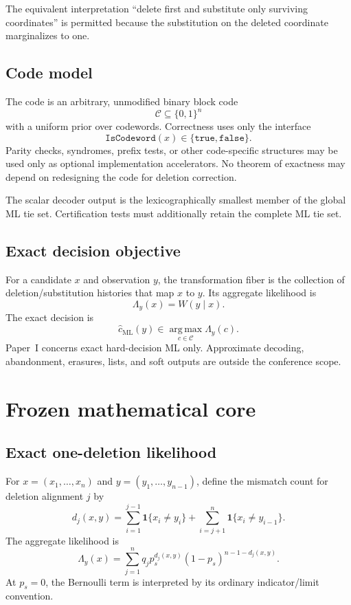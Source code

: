 \documentclass[11pt]{article}
\theoremstyle{definition}
\theoremstyle{remark}
\newcommand{\C}{\mathcal{C}}
\newcommand{\ind}{\mathbf{1}}
\newcommand{\argmax}{\operatorname*{arg\,max}}
\begin{document}
The equivalent interpretation ``delete first and substitute only surviving coordinates'' is permitted because the substitution on the deleted coordinate marginalizes to one.

\subsection{Code model}

The code is an arbitrary, unmodified binary block code
\[
\C\subseteq\{0,1\}^n
\]
with a uniform prior over codewords. Correctness uses only the interface
\[
\texttt{IsCodeword}(x)\in\{\texttt{true},\texttt{false}\}.
\]
Parity checks, syndromes, prefix tests, or other code-specific structures may be used only as optional implementation accelerators. No theorem of exactness may depend on redesigning the code for deletion correction.

The scalar decoder output is the lexicographically smallest member of the global ML tie set. Certification tests must additionally retain the complete ML tie set.

\subsection{Exact decision objective}

For a candidate $x$ and observation $y$, the transformation fiber is the collection of deletion/substitution histories that map $x$ to $y$. Its aggregate likelihood is
\[
\Lambda_y(x)=W(y\mid x).
\]
The exact decision is
\[
\widehat c_{\mathrm{ML}}(y)
\in
\argmax_{c\in\C}\Lambda_y(c).
\]
Paper~I concerns exact hard-decision ML only. Approximate decoding, abandonment, erasures, lists, and soft outputs are outside the conference scope.

\section{Frozen mathematical core}

\subsection{Exact one-deletion likelihood}

For $x=(x_1,\ldots,x_n)$ and $y=(y_1,\ldots,y_{n-1})$, define the mismatch count for deletion alignment $j$ by
\begin{equation}
 d_j(x,y)=
 \sum_{i=1}^{j-1}\ind\{x_i\ne y_i\}
 +\sum_{i=j+1}^{n}\ind\{x_i\ne y_{i-1}\}.
 \label{eq:dj}
\end{equation}
The aggregate likelihood is
\begin{equation}
\boxed{
\Lambda_y(x)=
\sum_{j=1}^{n}q_j
p_s^{d_j(x,y)}(1-p_s)^{n-1-d_j(x,y)}.}
\label{eq:likelihood}
\end{equation}
At $p_s=0$, the Bernoulli term is interpreted by its ordinary indicator/limit convention.
\end{document}
